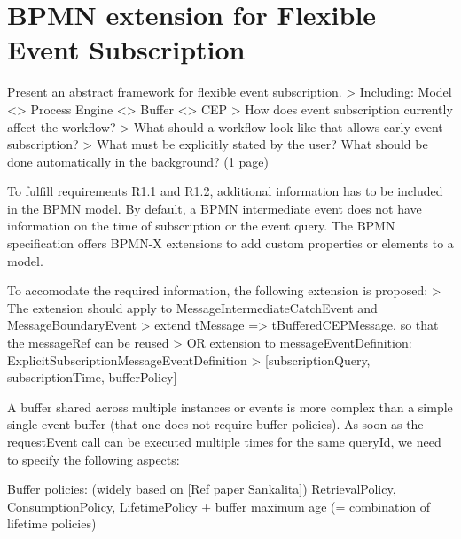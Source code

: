 \chapter{BPMN extension for Flexible Event Subscription}\label{ch:flexibleeventsubscription}

Present an abstract framework for flexible event subscription.
> Including: Model <> Process Engine <> Buffer <> CEP
> How does event subscription currently affect the workflow?
> What should a workflow look like that allows early event subscription?
> What must be explicitly stated by the user? What should be done automatically in the background?
(1 page)

To fulfill requirements R1.1 and R1.2, additional information has to be included in the BPMN model. By default, a BPMN intermediate event does not have information on the time of subscription or the event query. 
The BPMN specification offers BPMN-X extensions to add custom properties or elements to a model.

To accomodate the required information, the following extension is proposed:
> The extension should apply to MessageIntermediateCatchEvent and MessageBoundaryEvent
> extend tMessage => tBufferedCEPMessage, so that the messageRef can be reused
> OR extension to messageEventDefinition: ExplicitSubscriptionMessageEventDefinition
> [subscriptionQuery, subscriptionTime, bufferPolicy]

A buffer shared across multiple instances or events is more complex than a simple single-event-buffer (that one does not require buffer policies). As soon as the requestEvent call can be executed multiple times for the same queryId, we need to specify the following aspects:

Buffer policies:
(widely based on [Ref paper Sankalita]) RetrievalPolicy, ConsumptionPolicy, LifetimePolicy
+ buffer maximum age (= combination of lifetime policies)

